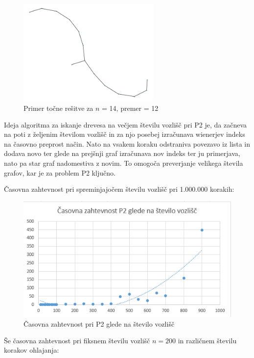 \documentclass[a4paper, 12 pt]{article}
\begin{document}
\begin{figure}[H]
\centering
  \includegraphics[width=7cm]{drevo14diam12.png}
  \caption{Primer točne rešitve za $n$ = 14, premer = 12}
  \label{fig:graf1}
\end{figure}

\vspace{1cm}

Ideja algoritma za iskanje drevesa na večjem številu vozlišč pri P2 je, da začneva na poti z željenim številom vozlišč in za njo posebej izračunava wienerjev indeks na časovno preprost način. Nato na vsakem koraku odstraniva povezavo iz lista in dodava novo ter glede na prejšnji graf izračunava nov indeks ter ju primerjava, nato pa star graf nadomestiva z novim. To omogoča preverjanje velikega števila grafov, kar je za problem P2 ključno.

Časovna zahtevnost pri spreminjajočem številu vozlišč pri 1.000.000 korakih:

\begin{figure}[H]
\centering
  \includegraphics[width=12cm]{casovna_p2_n.png}
  \caption{Časovna zahtevnost pri P2 glede na število vozlišč}
  \label{fig:p2_časovna_zaht_n} 
\end{figure}

\vspace{1cm}

Še časovna zahtevnost pri fiksnem številu vozlišč $n = 200$ in različnem številu korakov ohlajanja:
\end{document}
